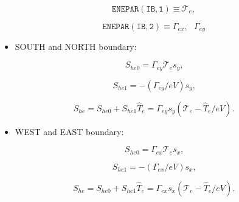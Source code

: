 \documentclass[11pt]{article}
\begin{document}
\bigskip

\begin{equation*}
\mathtt{ENEPAR(IB,1)}\equiv\mathcal{T}_{e}, 
\end{equation*}

\begin{equation*}
\mathtt{ENEPAR(IB,2)}\equiv\Gamma_{ex},\text{ }\Gamma_{ey}
\end{equation*}

\bigskip

\begin{itemize}
\item  SOUTH and NORTH boundary:
\end{itemize}

\bigskip

\begin{equation}
S_{he0}=\mathcal{\Gamma}_{ey}\mathcal{T}_{e}s_{y}\text{,}   \label{c199}
\end{equation}

\begin{equation}
S_{he1}=-\left( \mathcal{\Gamma}_{ey}/eV\right) s_{y}\text{,}   \label{c200}
\end{equation}

\begin{equation}
S_{he}=S_{he0}+S_{he1}\widehat{T}_{e}=\mathcal{\Gamma}_{ey}s_{y}\left( 
\mathcal{T}_{e}-\widehat{T}_{e}/eV\right) \text{.}   \label{c201}
\end{equation}

\bigskip

\begin{itemize}
\item  WEST and EAST boundary:
\end{itemize}

\bigskip

\begin{equation}
S_{he0}=\mathcal{\Gamma}_{ex}\mathcal{T}_{e}s_{x}\text{,}   \label{c202}
\end{equation}

\begin{equation}
S_{he1}=-\left( \mathcal{\Gamma}_{ex}/eV\right) s_{x}\text{,}   \label{c203}
\end{equation}

\begin{equation}
S_{he}=S_{he0}+S_{he1}\widehat{T}_{e}=\mathcal{\Gamma}_{ex}s_{x}\left( 
\mathcal{T}_{e}-\widehat{T}_{e}/eV\right) \text{.}   \label{c204}
\end{equation}
\end{document}
